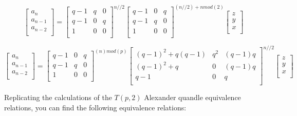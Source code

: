 \documentclass[paper.tex]{subfiles}
\begin{document}
\[ 
\left[ \begin{array}{ccc}
a_{n} \\
a_{n-1} \\
a_{n-2} \\
\end{array} \right] 
=
\left[ \begin{array}{ccc}
q-1 & q & 0 \\
q-1 & 0 & q \\
1 & 0 & 0 \\
\end{array} \right] ^{n//2} 
\left[ \begin{array}{ccc}
q-1 & 0 & q \\
q-1 & q & 0 \\
1 & 0 & 0 \\
\end{array} \right] ^{(n//2) + n mod(2)}
\left[ \begin{array}{ccc}
z \\
y \\
x \\
\end{array} \right] 
\] 

\[ 
\left[ \begin{array}{ccc}
a_{n} \\
a_{n-1} \\
a_{n-2} \\
\end{array} \right] 
=
\left[ \begin{array}{ccc}
q-1 & 0 & q \\
q-1 & q & 0 \\
1 & 0 & 0 \\
\end{array} \right] ^{(n)mod(p)}
\left[ \begin{array}{ccc}
(q-1)^{2} + q(q-1) & q^{2} & (q-1)q \\
(q-1)^{2} + q & 0 & (q-1)q \\
q-1 & 0 & q \\
\end{array} \right] ^{n//2} 
\left[ \begin{array}{ccc}
z \\
y \\
x \\
\end{array} \right] 
\] 

Replicating the calculations of the $T(p,2)$ Alexander quandle equivalence relations, you can find the following equivalence relations:
\end{document}
